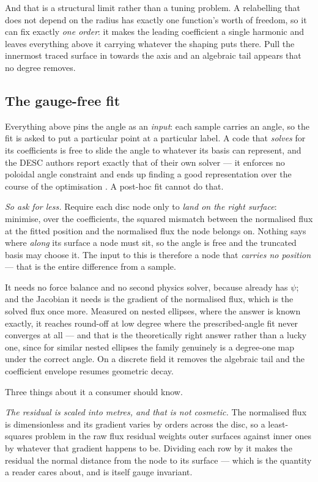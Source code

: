 And that is a structural limit rather than a tuning problem. A relabelling that
does not depend on the radius has exactly one function's worth of freedom, so it
can fix exactly \emph{one order}: it makes the leading coefficient a single
harmonic and leaves everything above it carrying whatever the shaping puts there.
Pull the innermost traced surface in towards the axis and an algebraic tail
appears that no degree removes.

\subsection{The gauge-free fit}

Everything above pins the angle as an \emph{input}: each sample carries an angle,
so the fit is asked to put a particular point at a particular label. A code that
\emph{solves} for its coefficients is free to slide the angle to whatever its
basis can represent, and the DESC authors report exactly that of their own solver
--- it enforces no poloidal angle constraint and ends up finding a good
representation over the course of the optimisation \cite{PaniciDESC2023}. A
post-hoc fit cannot do that.

\emph{So ask for less.} Require each disc node only to \emph{land on the right
surface}: minimise, over the coefficients, the squared mismatch between the
normalised flux at the fitted position and the normalised flux the node belongs
on. Nothing says where \emph{along} its surface a node must sit, so the angle is
free and the truncated basis may choose it. The input to this is therefore a node
that \emph{carries no position} --- that is the entire difference from a sample.

It needs no force balance and no second physics solver, because {\meq} already
has $\psi$; and the Jacobian it needs is the gradient of the normalised flux,
which is the solved flux once more. Measured on nested ellipses, where the answer
is known exactly, it reaches round-off at low degree where the prescribed-angle
fit never converges at all --- and that is the theoretically right answer rather
than a lucky one, since for similar nested ellipses the family genuinely is a
degree-one map under the correct angle. On a discrete field it removes the
algebraic tail and the coefficient envelope resumes geometric decay.

Three things about it a consumer should know.

\emph{The residual is scaled into metres, and that is not cosmetic.} The
normalised flux is dimensionless and its gradient varies by orders across the
disc, so a least-squares problem in the raw flux residual weights outer surfaces
against inner ones by whatever that gradient happens to be. Dividing each row by
it makes the residual the normal distance from the node to its surface --- which
is the quantity a reader cares about, and is itself gauge invariant.

